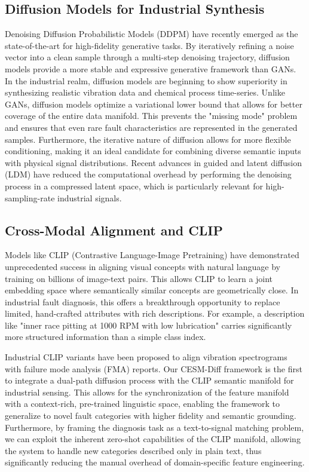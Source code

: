 \subsection{Diffusion Models for Industrial Synthesis}
Denoising Diffusion Probabilistic Models (DDPM) have recently emerged as the state-of-the-art for high-fidelity generative tasks. By iteratively refining a noise vector into a clean sample through a multi-step denoising trajectory, diffusion models provide a more stable and expressive generative framework than GANs. In the industrial realm, diffusion models are beginning to show superiority in synthesizing realistic vibration data and chemical process time-series. Unlike GANs, diffusion models optimize a variational lower bound that allows for better coverage of the entire data manifold. This prevents the "missing mode" problem and ensures that even rare fault characteristics are represented in the generated samples. Furthermore, the iterative nature of diffusion allows for more flexible conditioning, making it an ideal candidate for combining diverse semantic inputs with physical signal distributions. Recent advances in guided and latent diffusion (LDM) have reduced the computational overhead by performing the denoising process in a compressed latent space, which is particularly relevant for high-sampling-rate industrial signals.

\subsection{Cross-Modal Alignment and CLIP}
Models like CLIP (Contrastive Language-Image Pretraining) have demonstrated unprecedented success in aligning visual concepts with natural language by training on billions of image-text pairs. This allows CLIP to learn a joint embedding space where semantically similar concepts are geometrically close. In industrial fault diagnosis, this offers a breakthrough opportunity to replace limited, hand-crafted attributes with rich descriptions. For example, a description like "inner race pitting at 1000 RPM with low lubrication" carries significantly more structured information than a simple class index.

Industrial CLIP variants have been proposed to align vibration spectrograms with failure mode analysis (FMA) reports. Our CESM-Diff framework is the first to integrate a dual-path diffusion process with the CLIP semantic manifold for industrial sensing. This allows for the synchronization of the feature manifold with a context-rich, pre-trained linguistic space, enabling the framework to generalize to novel fault categories with higher fidelity and semantic grounding. Furthermore, by framing the diagnosis task as a text-to-signal matching problem, we can exploit the inherent zero-shot capabilities of the CLIP manifold, allowing the system to handle new categories described only in plain text, thus significantly reducing the manual overhead of domain-specific feature engineering.

